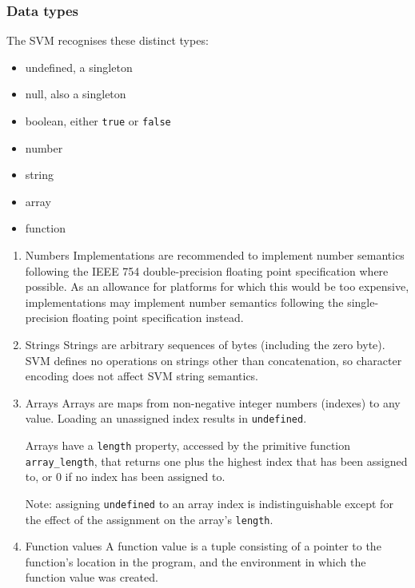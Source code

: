 \subsubsection{Data types}
\label{sec:org7f680a2}
The SVM recognises these distinct types:

\begin{itemize}
\item undefined, a singleton
\item null, also a singleton
\item boolean, either \texttt{true} or \texttt{false}
\item number
\item string
\item array
\item function
\end{itemize}

\begin{enumerate}
\item Numbers
\label{sec:org7d29292}
Implementations are recommended to implement number semantics following
the IEEE 754 double-precision floating point specification where
possible. As an allowance for platforms for which this would be too
expensive, implementations may implement number semantics following the
single-precision floating point specification instead.

\item Strings
\label{sec:org91f31a5}
Strings are arbitrary sequences of bytes (including the zero byte). SVM
defines no operations on strings other than concatenation, so character
encoding does not affect SVM string semantics.

\item Arrays
\label{sec:orgd568c88}
Arrays are maps from non-negative integer numbers (indexes) to any
value. Loading an unassigned index results in \texttt{undefined}.

Arrays have a \texttt{length} property, accessed by the primitive function
\texttt{array\_length}, that returns one plus the highest index that has been
assigned to, or 0 if no index has been assigned to.

Note: assigning \texttt{undefined} to an array index is indistinguishable
except for the effect of the assignment on the array's \texttt{length}.

\item Function values
\label{sec:orgd197755}
A function value is a tuple consisting of a pointer to the function's
location in the program, and the environment in which the function value
was created.
\end{enumerate}

